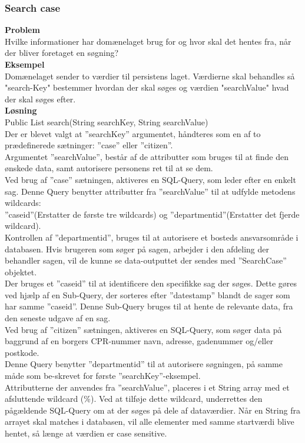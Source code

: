 \subsubsection{Search case}
\textbf{Problem} \\
Hvilke informationer har domænelaget brug for og hvor skal det hentes fra, når der bliver foretaget en søgning?\\
\textbf{Eksempel} \\
Domænelaget sender to værdier til persistens laget. Værdierne skal behandles så "search-Key" bestemmer hvordan der skal søges og værdien "searchValue" hvad der skal søges efter.\\
\textbf{Løsning} \\
Public List search(String searchKey, String searchValue)\\
Der er blevet valgt at ”searchKey” argumentet, håndteres som en af to prædefinerede sætninger: ”case” eller ”citizen”.\\
Argumentet ”searchValue”, består af de attributter som bruges til at finde den ønskede data, samt autorisere personens ret til at se dem.\\
Ved brug af ”case” sætningen, aktiveres en SQL-Query, som leder efter en enkelt sag. Denne Query benytter attributter fra ”searchValue” til at udfylde metodens wildcards:\\
”caseid”(Erstatter de første tre wildcards) og ”departmentid”(Erstatter det fjerde wildcard).\\
Kontrollen af ”departmentid”, bruges til at autorisere et bosteds ansvarsområde i databasen. Hvis brugeren som søger på sagen, arbejder i den afdeling der behandler sagen, vil de kunne se data-outputtet der sendes med ”SearchCase” objektet.\\
Der bruges et ”caseid” til at identificere den specifikke sag der søges. Dette gøres ved hjælp af en Sub-Query, der sorteres efter ”datestamp” blandt de sager som har samme ”caseid”. Denne Sub-Query bruges til at hente de relevante data, fra den seneste udgave af en sag.\\
Ved brug af ”citizen” sætningen, aktiveres en SQL-Query, som søger data på baggrund af en borgers CPR-nummer navn, adresse, gadenummer og/eller postkode.\\
Denne Query benytter ”departmentid” til at autorisere søgningen, på samme måde som be-skrevet for første ”searchKey”-eksempel.\\
Attributterne der anvendes fra ”searchValue”, placeres i et String array med et afsluttende wildcard (\%). Ved at tilføje dette wildcard, underrettes den pågældende SQL-Query om at der søges på dele af dataværdier. Når en String fra arrayet skal matches i databasen, vil alle elementer med samme startværdi blive hentet, så længe at værdien er case sensitive.\\
